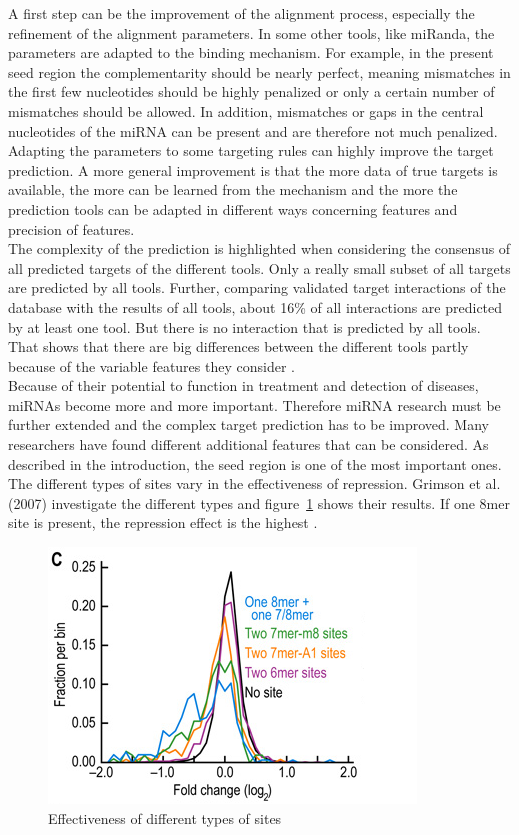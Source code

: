 \documentclass[11pt, a4paper, oneside]{book}
\begin{document}
A first step can be the improvement of the alignment process, especially the refinement of the alignment parameters. In some other tools, like miRanda, the parameters are adapted to the binding mechanism. For example, in the present seed region the complementarity should be nearly perfect, meaning mismatches in the first few nucleotides should be highly penalized or only a certain number of mismatches should be allowed. In addition, mismatches or gaps in the central nucleotides of the miRNA can be present and are therefore not much penalized. Adapting the parameters to some targeting rules can highly improve the target prediction. A more general improvement is that the more data of true targets is available, the more can be learned from the mechanism and the more the prediction tools can be adapted in different ways concerning features and precision of features.\\

The complexity of the prediction is highlighted when considering the consensus of all predicted targets of the different tools. Only a really small subset of all targets are predicted by all tools. Further, comparing validated target interactions of the database with the results of all tools, about 16\% of all interactions are predicted by at least one tool. But there is no interaction that is predicted by all tools. That shows that there are big differences between the different tools partly because of the variable features they consider \cite{Keller}.\\ 

Because of their potential to function in treatment and detection of diseases, miRNAs become more and more important. Therefore miRNA research must be further extended and the complex target prediction has to be improved. Many researchers have found different additional features that can be considered. As described in the introduction, the seed region is one of the most important ones. The different types of sites vary in the effectiveness of repression. Grimson et al. (2007) investigate the different types and figure~\ref{types} shows their results. If one 8mer site is present, the repression effect is the highest \cite{Grimson}. \\


\begin{figure}
\centering
\includegraphics[scale=0.7]{results/site_3addi.png}
\caption{Effectiveness of different types of sites}
\label{types}
\end{figure}
\end{document}
